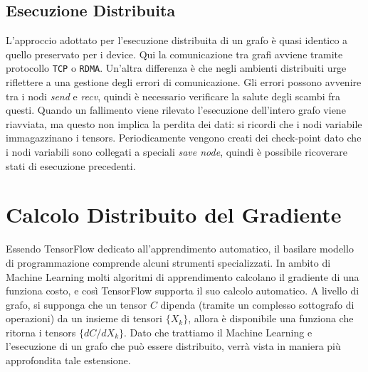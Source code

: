 \documentclass[DIV=calc, paper=a4, fontsize=11pt]{scrartcl}	 %
\begin{document}
\begin{multicols}{2}
			\subsection{Esecuzione Distribuita}
				L'approccio adottato per l'esecuzione distribuita di un grafo è quasi identico a quello preservato per i device. Qui la comunicazione tra grafi avviene tramite protocollo \texttt{TCP} o \texttt{RDMA}. Un'altra differenza è che negli ambienti distribuiti urge riflettere a una gestione degli errori di comunicazione. Gli errori possono avvenire tra i nodi \textit{send} e \textit{recv}, quindi è necessario verificare la salute degli scambi fra questi. Quando un fallimento viene rilevato l'esecuzione dell'intero grafo viene riavviata, ma questo non implica la perdita dei dati: si ricordi che i nodi variabile immagazzinano i tensors. Periodicamente vengono creati dei check-point dato che i nodi variabili sono collegati a speciali \textit{save node}, quindi è possibile ricoverare stati di esecuzione precedenti.
		\section{Calcolo Distribuito del Gradiente}
			Essendo TensorFlow dedicato all'apprendimento automatico, il basilare modello di programmazione comprende alcuni strumenti specializzati. In ambito di Machine Learning molti algoritmi di apprendimento calcolano il gradiente di una funziona costo, e così TensorFlow supporta il suo calcolo automatico. A livello di grafo, si supponga che un tensor $C$ dipenda (tramite un complesso sottografo di operazioni) da un insieme di tensori $\{X_k\}$, allora è disponibile una funziona che ritorna i tensors $\{dC/dX_k\}$. Dato che trattiamo il Machine Learning e l'esecuzione di un grafo che può essere distribuito, verrà vista in maniera più approfondita tale estensione.
			

\end{multicols}
\end{document}

